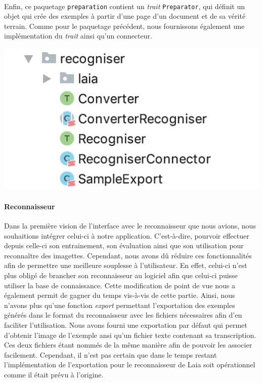 \paragraph{}
Enfin, ce paquetage \texttt{preparation} contient un \textit{trait} \texttt{Preparator}, qui définit un objet qui crée des exemples à partir d'une page d'un document et de sa vérité terrain. Comme pour le paquetage précédent, nous fournissons également une implémentation du \textit{trait} ainsi qu'un connecteur.

\begin{mdframed}[frametitle={Figure 4 : Paquetage \texttt{recogniser}}, innerbottommargin=10]
\begin{center}
\includegraphics[scale=0.7]{assets/recogniser.png}
\end{center}
\end{mdframed}

\paragraph{Reconnaisseur}
Dans la première vision de l'interface avec le reconnaisseur que nous avions, nous souhaitions intégrer celui-ci à notre application. C'est-à-dire, pourvoir effectuer depuis celle-ci son entrainement, son évaluation ainsi que son utilisation pour reconnaître des imagettes. Cependant, nous avons dû réduire ces fonctionnalités afin de permettre une meilleure souplesse à l'utilisateur. En effet, celui-ci n'est plus obligé de brancher son reconnaisseur au logiciel afin que celui-ci puisse utiliser la base de connaissance. Cette modification de point de vue nous a également permit de gagner du temps vis-à-vis de cette partie. Ainsi, nous n'avons plus qu'une fonction \textit{export} permettant l'exportation des exemples générés dans le format du reconnaisseur avec les fichiers nécessaires afin d'en faciliter l'utilisation.
Nous avons fourni une exportation par défaut qui permet d'obtenir l'image de l'exemple ansi qu'un fichier texte contenant sa transcription. Ces deux fichiers étant nommés de la même manière afin de pouvoir les associer facilement.
Cependant, il n'est pas certain que dans le temps restant l'implémentation de l'exportation pour le reconnaisseur de Laia soit opérationnel comme il était prévu à l'origine.

